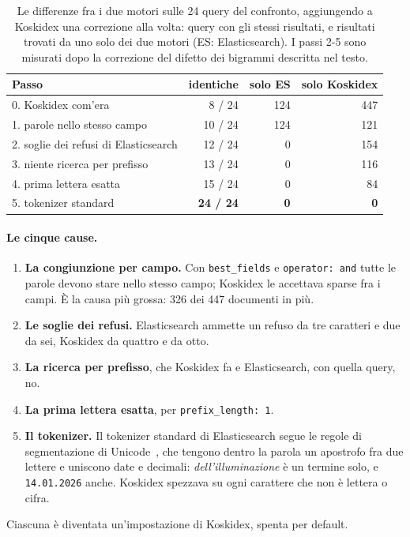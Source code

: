 \begin{table}[ht]
  \centering
  \small
  \begin{tabular}{lrrr}
    \toprule
    Passo & identiche & solo ES & solo Koskidex \\
    \midrule
    0. Koskidex com'era & 8 / 24 & 124 & 447 \\
    1. parole nello stesso campo & 10 / 24 & 124 & 121 \\
    2. soglie dei refusi di Elasticsearch & 12 / 24 & 0 & 154 \\
    3. niente ricerca per prefisso & 13 / 24 & 0 & 116 \\
    4. prima lettera esatta & 15 / 24 & 0 & 84 \\
    5. tokenizer standard & \textbf{24 / 24} & \textbf{0} & \textbf{0} \\
    \bottomrule
  \end{tabular}
  \caption{Le differenze fra i due motori sulle 24 query del confronto,
  aggiungendo a Koskidex una correzione alla volta: query con gli stessi risultati,
  e risultati trovati da uno solo dei due motori (ES: Elasticsearch). I passi 2-5 sono misurati
  dopo la correzione del difetto dei bigrammi descritta nel testo.}
  \label{tab:divergenza}
\end{table}

\paragraph{Le cinque cause.}
\begin{enumerate}
  \item \textbf{La congiunzione per campo.} Con \texttt{best\_fields} e
        \texttt{operator: and} tutte le parole devono stare nello stesso campo;
        Koskidex le accettava sparse fra i campi. È la causa più grossa: 326
        dei 447 documenti in più.
  \item \textbf{Le soglie dei refusi.} Elasticsearch ammette un refuso da tre
        caratteri e due da sei, Koskidex da quattro e da otto.
  \item \textbf{La ricerca per prefisso}, che Koskidex fa e Elasticsearch, con
        quella query, no.
  \item \textbf{La prima lettera esatta}, per \texttt{prefix\_length: 1}.
  \item \textbf{Il tokenizer.} Il tokenizer standard di Elasticsearch segue le
        regole di segmentazione di Unicode~\cite{uax29}, che tengono dentro la
        parola un apostrofo fra due lettere e uniscono date e decimali:
        \emph{dell'illuminazione} è un termine solo, e \texttt{14.01.2026}
        anche. Koskidex spezzava su ogni carattere che non è lettera o cifra.
\end{enumerate}
Ciascuna è diventata un'impostazione di Koskidex, spenta per default.

